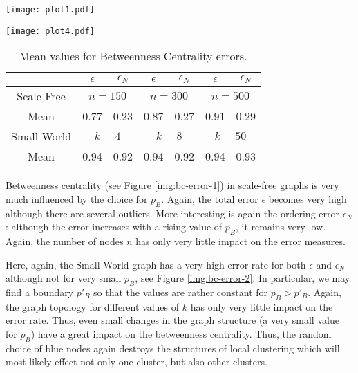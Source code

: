 \begin{figure*}[t] %
	\centering
	\texttt{[image: plot1.pdf]}
	\caption{Betweenness Centrality errors for scale-free random graphs ($n=150$, $n=300$ and $n=500$) for different values of $p_B$ between 0 and 0.3. }

	\label{img:bc-error-1}

	\centering
	\texttt{[image: plot4.pdf]}
	\caption{Betweenness Centrality errors for Newman-Watts-Strogatz small-world random graph ($n=150$, $k\in\{4,8,50\}$) for different values of $p_B$ between 0 and 0.3. }

	\label{img:bc-error-2}
\end{figure*}

\begin{table}
\centering
\begin{tabular}{|c|c|c|c|c|c|c|}
\hline 
 & $\epsilon$ & $\epsilon_{N}$ & $\epsilon$ & $\epsilon_{N}$ & $\epsilon$ & $\epsilon_{N}$\tabularnewline
\hline 
Scale-Free & \multicolumn{2}{c|}{$n=150$} & \multicolumn{2}{c|}{$n=300$} & \multicolumn{2}{c|}{$n=500$}\tabularnewline
\hline 
Mean & 0.77 & 0.23 & 0.87 & 0.27 & 0.91 & 0.29\tabularnewline
\hline 
Small-World & \multicolumn{2}{c|}{$k=4$} & \multicolumn{2}{c|}{$k=8$} & \multicolumn{2}{c|}{$k=50$}\tabularnewline
\hline 
Mean & 0.94 & 0.92 & 0.94 & 0.92 & 0.94 & 0.93\tabularnewline
\hline 
\end{tabular}
\vspace*{.1cm}
\caption{Mean values for Betweenness Centrality errors.}\label{tab:2}
\end{table}

Betweenness centrality (see Figure \ref{img:bc-error-1}) in scale-free graphs is very much influenced by the choice for $p_B$. Again, the total error $\epsilon$ becomes very high although there are several outliers. More interesting is again the ordering error $\epsilon_N$: although the error increases with a rising value of $p_B$, it remains very low. Again, the number of nodes $n$ has only very little impact on the error measures. 

Here, again, the Small-World graph has a very high error rate for both $\epsilon$ and $\epsilon_N$ although not for very small $p_B$, see Figure \ref{img:bc-error-2}. 
In particular, we may find a boundary $p'_B$ so that the values are rather constant for $p_B>p'_B$. Again, the graph topology for different values of $k$ has only very little impact on the error rate. Thus, even small changes in the graph structure (a very small value for $p_B$) have a great impact on the betweenness centrality. Thus, the random choice of blue nodes again destroys the structures of local clustering which will most likely effect not only one cluster, but also other clusters. 

